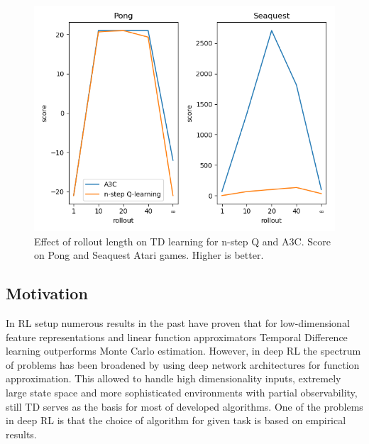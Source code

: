 \documentclass{article}
\begin{document}
\begin{figure}[H]
    \centering
    \includegraphics[scale=0.75]{results}
    \caption{Effect of rollout length on TD learning for n-step Q and A3C. Score on
    Pong and Seaquest Atari games. Higher is better.}
    \label{rollouts}
\end{figure}


\pagebreak


\subsection{Motivation}
In RL setup numerous results in the past have proven
that for low-dimensional feature representations and linear function
approximators Temporal Difference learning outperforms
Monte Carlo estimation. However, in deep RL the spectrum of problems
has been broadened by using deep network architectures for function
approximation. This allowed to handle high dimensionality inputs,
extremely large state space and more sophisticated environments with partial
observability, still TD serves as the basis for
most of developed algorithms. One of the problems in deep RL is that
the choice of algorithm for given task is based on empirical results.
\end{document}

